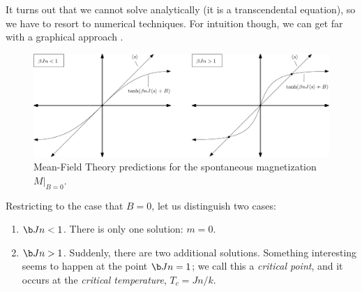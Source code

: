 It turns out that we cannot solve 
analytically (it is a transcendental equation), so we have to resort
to numerical techniques. For intuition though, we can get far with a
graphical approach .
\begin{figure}[ht]
  \centering \includegraphics[width=\textwidth]{figures/mft.png}
  \caption{Mean-Field Theory predictions for the spontaneous
    magnetization $M\rvert_{B=0}$.\label{fig:mft} }
\end{figure}

Restricting to the case that $B=0$, let us distinguish two cases:
\begin{enumerate}
\item $\b J n < 1$. There is only one solution: $m=0$.
\item $\b J n > 1$.  Suddenly, there are two additional
  solutions. Something interesting seems to happen at the point
  $\b J n =1$; we call this a \textit{critical point}, and it occurs
  at the \textit{critical temperature}, $T_c= J n / k$.
\end{enumerate}

